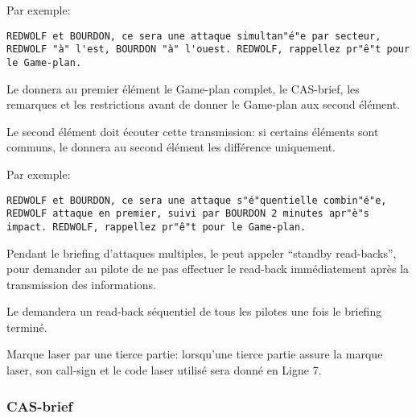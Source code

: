 \begin{e1}
\begin{e2}
\begin{e3}
\begin{minipage}{\linewidth}
				Par exemple:
				
				\begin{lstlisting}[caption=Game-plan: attaque par secteurs, label=gameplansector]
	REDWOLF et BOURDON, ce sera une attaque simultan"é"e par secteur, REDWOLF "à" l'est, BOURDON "à" l'ouest. REDWOLF, rappellez pr"ê"t pour le Game-plan.
				\end{lstlisting}
			\end{minipage}
			
		\end{e3}
		\begin{minipage}{\linewidth}
		\item Le \ja{} donnera au premier élément le Game-plan complet, le CAS-brief, les remarques et les restrictions avant de donner le Game-plan aux second élément.
		
		Le second élément doit écouter cette transmission: si certains éléments sont communs, le \ja{} donnera au second élément les différence uniquement.
		
		Par exemple:
		
		\begin{lstlisting}[caption=Game-plan: game-plan commun, label=gameplancommon]
	REDWOLF et BOURDON, ce sera une attaque s"é"quentielle combin"é"e, REDWOLF attaque en premier, suivi par BOURDON 2 minutes apr"è"s impact. REDWOLF, rappellez pr"ê"t pour le Game-plan.
		\end{lstlisting}
		\end{minipage}
		
		\item Pendant le briefing d'attaques multiples, le \ja{} peut appeler ``standby read-backs'', pour demander au pilote de ne pas effectuer le read-back immédiatement après la transmission des informations.
		
		Le \ja{} demandera un read-back séquentiel de tous les pilotes une fois le briefing terminé.
		
		\item Marque laser par une tierce partie: lorsqu'une tierce partie assure la marque laser, son call-sign et le code laser utilisé sera donné en Ligne 7.
		
		
	\end{e2}
	
\end{e1}

\subsubsection{CAS-brief}


